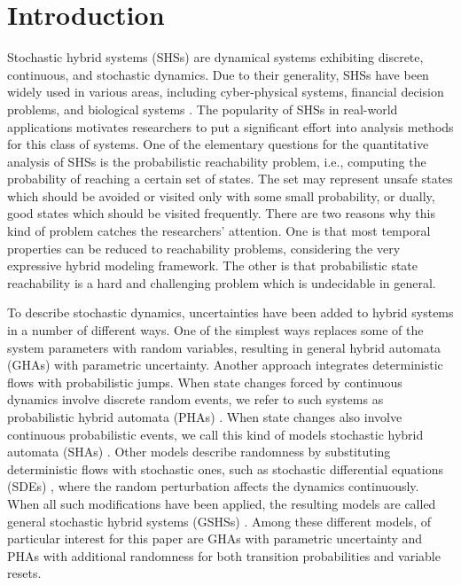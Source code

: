 \section{Introduction} 
Stochastic hybrid systems (SHSs) are dynamical systems exhibiting discrete, continuous, and stochastic dynamics. Due to their generality, SHSs have been widely used in various areas, including cyber-physical systems, financial decision problems, and biological systems \cite{blom2006stochastic, clarke2011statistical}. The popularity of SHSs in real-world applications motivates researchers to put a significant effort into analysis methods for this class of systems. One of the elementary questions for the quantitative analysis of SHSs is the probabilistic reachability problem, i.e., computing the probability of reaching a certain set of states. The set may represent unsafe states which should be avoided or visited only with some small probability, or dually, good states which should be visited frequently. There are two reasons why this kind of problem catches the researchers' attention. One is that most temporal properties can be reduced to reachability problems, considering the very expressive hybrid modeling framework. The other is that probabilistic state reachability is a hard and challenging problem which is undecidable in general. 

\vspace{-.2cm}
To describe stochastic dynamics, uncertainties have been added to hybrid systems in a number of different ways. One of the simplest ways replaces some of the system parameters with random variables, resulting in general hybrid automata (GHAs) with parametric uncertainty. Another approach integrates deterministic flows with probabilistic jumps. When state changes forced by continuous dynamics involve discrete random events, we refer to such systems as probabilistic hybrid automata (PHAs) \cite{sproston2000decidable}. When state changes also involve continuous probabilistic events, we call this kind of models stochastic hybrid automata (SHAs) \cite{franzle2011measurability}. Other models describe randomness by substituting deterministic flows with stochastic ones, such as stochastic differential equations (SDEs) \cite{ludwiga1974sde}, where the random perturbation affects the dynamics continuously. When all such modifications have been applied, the resulting models are called general stochastic hybrid systems (GSHSs) \cite{hu2000towards}. Among these different models, of particular interest for this paper are GHAs with parametric uncertainty and PHAs with additional randomness for both transition probabilities and variable resets. 

